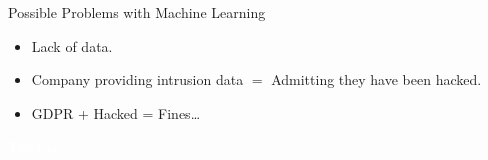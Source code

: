 \documentclass{beamer}
\begin{document}
\begin{frame}{Possible Problems with Machine Learning}

\begin{itemize}
\item Lack of data.
\item Company providing intrusion data $=$ Admitting they have been hacked.
\item GDPR + Hacked = Fines\ldots
\end{itemize}
    
\end{frame}

\bgroup
{}
\begin{frame}[t,plain]{}{}
  \begin{center}
    {\tiny \textcolor{white}{The End}}
  \end{center}
\end{frame}
\egroup
\end{document}
